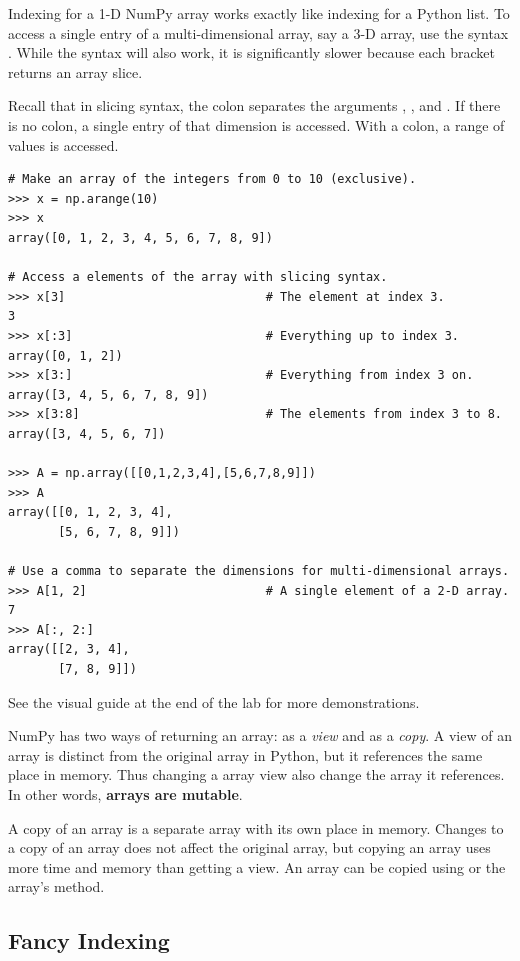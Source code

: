 Indexing for a 1-D NumPy array works exactly like indexing for a Python list. 
To access a single entry of a multi-dimensional array, say a 3-D array, use the syntax .
While the syntax  will also work, it is significantly slower because each bracket returns an array slice.

Recall that in slicing syntax, the colon \li{:} separates the arguments , , and .
If there is no colon, a single entry of that dimension is accessed.
With a colon, a range of values is accessed.

\begin{lstlisting}
# Make an array of the integers from 0 to 10 (exclusive).
>>> x = np.arange(10)
>>> x
array([0, 1, 2, 3, 4, 5, 6, 7, 8, 9])

# Access a elements of the array with slicing syntax.
>>> x[3]                            # The element at index 3.
3
>>> x[:3]                           # Everything up to index 3.
array([0, 1, 2])
>>> x[3:]                           # Everything from index 3 on.
array([3, 4, 5, 6, 7, 8, 9])
>>> x[3:8]                          # The elements from index 3 to 8.
array([3, 4, 5, 6, 7])

>>> A = np.array([[0,1,2,3,4],[5,6,7,8,9]])
>>> A
array([[0, 1, 2, 3, 4],
       [5, 6, 7, 8, 9]])

# Use a comma to separate the dimensions for multi-dimensional arrays.
>>> A[1, 2]                         # A single element of a 2-D array.
7
>>> A[:, 2:]
array([[2, 3, 4],
       [7, 8, 9]])
\end{lstlisting}

See the visual guide at the end of the lab for more demonstrations.

\begin{info} %
NumPy has two ways of returning an array: as a \emph{view} and as a \emph{copy}.
A view of an array is distinct from the original array in Python, but it references the same place in memory. 
Thus changing a array view also change the array it references.
In other words, \textbf{arrays are mutable}.

A copy of an array is a separate array with its own place in memory. 
Changes to a copy of an array does not affect the original array, but copying an array uses more time and memory than getting a view.
An array can be copied using  or the array's  method.
\end{info}

\subsection*{Fancy Indexing} %

